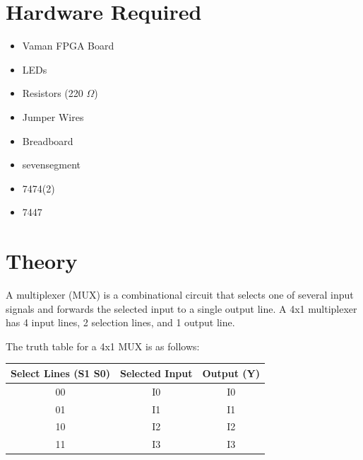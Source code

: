 \documentclass[a4paper,12pt]{article}
\begin{document}
\section*{Hardware Required}
\begin{itemize}
    \item Vaman FPGA Board
    \item LEDs
    \item Resistors (220 $\Omega$)
    \item Jumper Wires
    \item Breadboard
    \item sevensegment 
    \item 7474(2)
    \item 7447
\end{itemize}

\section*{Theory}
A multiplexer (MUX) is a combinational circuit that selects one of several input signals and forwards the selected input to a single output line.  
A 4x1 multiplexer has 4 input lines, 2 selection lines, and 1 output line.

The truth table for a 4x1 MUX is as follows:

\begin{center}
\begin{tabular}{|c|c|c|}
\hline
Select Lines (S1 S0) & Selected Input & Output (Y) \\
\hline
00 & I0 & I0 \\
01 & I1 & I1 \\
10 & I2 & I2 \\
11 & I3 & I3 \\
\hline
\end{tabular}
\end{center}
\end{document}
